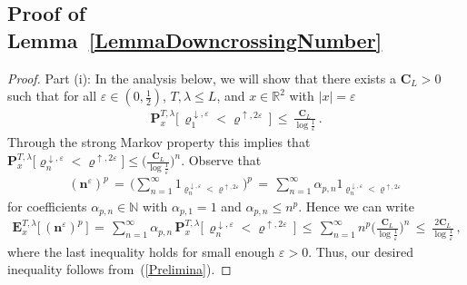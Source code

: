 \documentclass[10pt]{article}
\numberwithin{equation}{section}
\theoremstyle{definition}
\newcommand{\R}{{\mathbb R}}
\begin{document}
\subsection{Proof of Lemma~\ref{LemmaDowncrossingNumber}} \label{SubsectionLemmaDowncrossingNumber}


\begin{proof} \noindent Part (i): In the analysis below, we will show that there exists a $\mathbf{C}_L>0$ such that for all $\varepsilon \in (0,\frac{1}{2})$, $T,\lambda \leq  L$, and  $x\in \R^2 $ with $|x|=\varepsilon$ 
\begin{align}\label{Prelimina}
    \mathbf{P}^{T,\lambda }_x\Big[ \,\varrho^{\downarrow, \varepsilon}_1 < \varrho^{\uparrow, 2\varepsilon} \, \Big]\,\leq \,\frac{ \mathbf{C}_L }{\log \frac{1}{\varepsilon} }\,.
\end{align}
Through the strong Markov property this implies that $ \mathbf{P}^{T,\lambda }_x\big[ \varrho^{\downarrow, \varepsilon}_n < \varrho^{\uparrow, 2\varepsilon}  \big]\leq \big(\frac{ \mathbf{C}_L }{\log \frac{1}{\varepsilon}}\big)^n$.  Observe that
\begin{align*}
(\mathbf{n}^{\varepsilon})^p \,=\, \Bigg(\sum_{n=1}^{\infty}1_{\varrho^{\downarrow, \varepsilon}_n < \varrho^{\uparrow, 2\varepsilon} } \Bigg)^p   \,= \,  \sum_{n=1}^{\infty}\alpha_{p,n} 1_{\varrho^{\downarrow, \varepsilon}_n < \varrho^{\uparrow, 2\varepsilon} } 
\end{align*}
for coefficients $\alpha_{p,n} \in \mathbb{N} $ with $\alpha_{p,1}=1$ and $\alpha_{p,n} \leq  n^{p} $. Hence we can write
\begin{align}\label{ENNY}
     \mathbf{E}^{T,\lambda }_x\big[\, (\mathbf{n}^{\varepsilon})^p\,\big] \,= \, \sum_{n=1}^{\infty} \alpha_{p,n}  \,\mathbf{P}^{T,\lambda }_x\Big[\, \varrho^{\downarrow, \varepsilon}_n < \varrho^{\uparrow, 2\varepsilon} \,\Big] \,\leq \, \sum_{n=1}^{\infty} n^p  \bigg(\frac{ \mathbf{C}_L }{ \log\frac{1}{\varepsilon}     }\bigg)^n \,\leq \,\frac{ 2\mathbf{C}_L }{\log \frac{1}{\varepsilon}} \,,
\end{align}
where the last inequality holds for small enough $\varepsilon>0$. Thus, our desired inequality follows from~(\ref{Prelimina}).\vspace{.2cm}




\end{proof}
\end{document}
